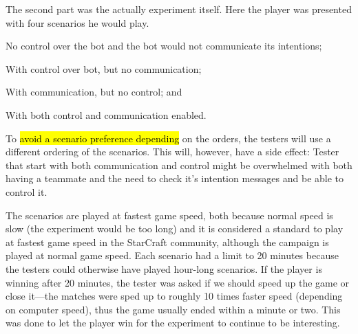 The second part was the actually experiment itself. Here the player was presented with four scenarios he would play.
\begin{inparaenum}[1\upshape)]
	\item No control over the bot and the bot would not communicate its intentions;
	\item With control over bot, but no communication;
	\item With communication, but no control; and
	\item With both control and communication enabled.
\end{inparaenum}
To \hl{avoid a scenario preference depending} on the orders, the testers will use a different ordering of the scenarios. This will, however, have a side effect: Tester that start with both communication and control might be overwhelmed with both having a teammate and the need to check it’s intention messages and be able to control it.

The scenarios are played at fastest game speed, both because normal speed is slow (the experiment would be too long) and it is considered a standard to play at fastest game speed in the StarCraft community, although the campaign is played at normal game speed. Each scenario had a limit to 20 minutes because the testers could otherwise have played hour-long scenarios. If the player is winning after 20 minutes, the tester was asked if we should speed up the game or close it—the matches were sped up to roughly 10 times faster speed (depending on computer speed), thus the game usually ended within a minute or two. This was done to let the player win for the experiment to continue to be interesting.
